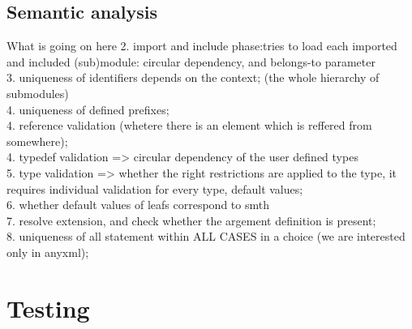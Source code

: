 \documentclass[conference]{IEEEtran}
\begin{document}
\subsection{Semantic analysis}
What is going on here
2. import and include phase:tries to load each imported and included (sub)module: circular dependency, and belongs-to parameter\\
3. uniqueness of identifiers depends on  the context; (the whole hierarchy of submodules) \\
4. uniqueness of defined prefixes; \\
4. reference validation (whetere there is an element which is reffered from somewhere);\\
4. typedef validation => circular dependency of the user defined types\\
5. type validation => whether the right restrictions are applied to the type, it requires individual validation for every type, default values;\\
6. whether default values of leafs correspond to smth\\
7. resolve extension, and check whether the argement definition is present;\\
8. uniqueness of all statement within ALL CASES in a choice (we are interested only in anyxml);\\

\section{Testing}
\end{document}
